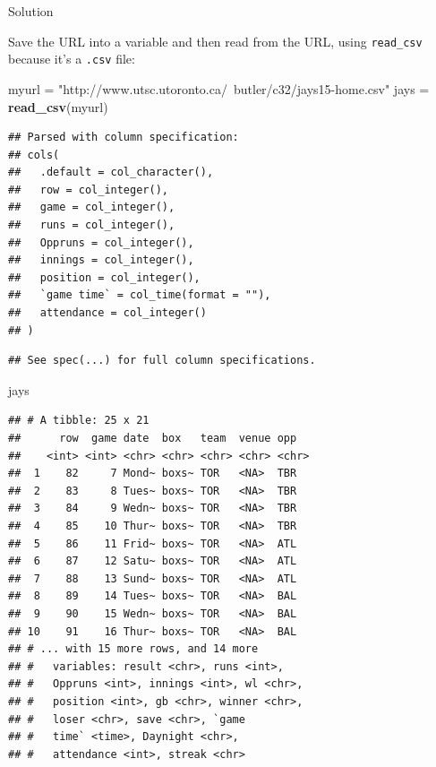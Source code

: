 \documentclass[]{tufte-book}
\newenvironment{Shaded}{}{}
\newcommand{\KeywordTok}[1]{\textcolor[rgb]{0.00,0.44,0.13}{\textbf{#1}}}
\newcommand{\NormalTok}[1]{#1}
\newcommand{\StringTok}[1]{\textcolor[rgb]{0.25,0.44,0.63}{#1}}
\theoremstyle{definition}
\theoremstyle{definition}
\theoremstyle{definition}
\theoremstyle{remark}
\begin{document}
Solution

Save the URL into a variable and then read from the URL, using
\texttt{read\_csv} because it's a \texttt{.csv} file:

\begin{Shaded}
\begin{Highlighting}[]
\NormalTok{myurl =}\StringTok{ "http://www.utsc.utoronto.ca/~butler/c32/jays15-home.csv"}
\NormalTok{jays =}\StringTok{ }\KeywordTok{read_csv}\NormalTok{(myurl)}
\end{Highlighting}
\end{Shaded}

\begin{verbatim}
## Parsed with column specification:
## cols(
##   .default = col_character(),
##   row = col_integer(),
##   game = col_integer(),
##   runs = col_integer(),
##   Oppruns = col_integer(),
##   innings = col_integer(),
##   position = col_integer(),
##   `game time` = col_time(format = ""),
##   attendance = col_integer()
## )
\end{verbatim}

\begin{verbatim}
## See spec(...) for full column specifications.
\end{verbatim}

\begin{Shaded}
\begin{Highlighting}[]
\NormalTok{jays}
\end{Highlighting}
\end{Shaded}

\begin{verbatim}
## # A tibble: 25 x 21
##      row  game date  box   team  venue opp  
##    <int> <int> <chr> <chr> <chr> <chr> <chr>
##  1    82     7 Mond~ boxs~ TOR   <NA>  TBR  
##  2    83     8 Tues~ boxs~ TOR   <NA>  TBR  
##  3    84     9 Wedn~ boxs~ TOR   <NA>  TBR  
##  4    85    10 Thur~ boxs~ TOR   <NA>  TBR  
##  5    86    11 Frid~ boxs~ TOR   <NA>  ATL  
##  6    87    12 Satu~ boxs~ TOR   <NA>  ATL  
##  7    88    13 Sund~ boxs~ TOR   <NA>  ATL  
##  8    89    14 Tues~ boxs~ TOR   <NA>  BAL  
##  9    90    15 Wedn~ boxs~ TOR   <NA>  BAL  
## 10    91    16 Thur~ boxs~ TOR   <NA>  BAL  
## # ... with 15 more rows, and 14 more
## #   variables: result <chr>, runs <int>,
## #   Oppruns <int>, innings <int>, wl <chr>,
## #   position <int>, gb <chr>, winner <chr>,
## #   loser <chr>, save <chr>, `game
## #   time` <time>, Daynight <chr>,
## #   attendance <int>, streak <chr>
\end{verbatim}
\end{document}
